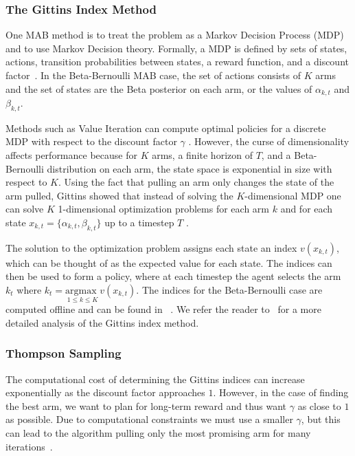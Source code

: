 \documentclass[10pt, conference]{ieeeconf}      %
\begin{document}

\subsubsection{The Gittins Index Method} 
One MAB method is to treat the problem as a Markov Decision Process (MDP) and to use Markov Decision theory.
Formally, a MDP is defined by sets of states, actions, transition probabilities between states, a reward function, and a discount factor~\cite{barto1998reinforcement}.
In the Beta-Bernoulli MAB case, the set of actions consists of $K$ arms and the set of states are the Beta posterior on each arm, or the values of $\alpha_{k,t}$ and $\beta_{k,t}$. 

Methods such as Value Iteration can compute optimal policies for a discrete MDP with respect to the discount factor $\gamma$ \cite{barto1998reinforcement}.
However, the curse of dimensionality affects performance because for $K$ arms, a finite horizon of $T$, and a
Beta-Bernoulli distribution on each arm, the state space is exponential in size with respect to $K$.
Using the fact that pulling an arm only changes the state of the arm pulled, Gittins showed that instead of solving the $K$-dimensional MDP one can solve $K$ 1-dimensional optimization problems for each arm $k$ and for each state $x_{k,t} = \lbrace \alpha_{k,t}, \beta_{k,t} \rbrace$ up to a timestep $T$ \cite{weber1992gittins}. 

The solution to the optimization problem assigns each state an index $v(x_{k,t})$, which can be thought of as the expected value for each state. 
The indices can then be used to form a policy, where at each timestep the agent selects the arm $k_t$ where $k_t= \underset{1 \leq k \leq K}{\mbox{argmax }} v(x_{k,t})$.  The indices for the Beta-Bernoulli case are computed offline and can be found in ~\cite{gittins2011multi}.
We refer the reader to~\cite{gittins2011multi} for a more detailed analysis of the Gittins index method.
 

\subsubsection{Thompson Sampling}
The computational cost of determining the Gittins indices can increase exponentially as the discount factor approaches $1$.
However, in the case of finding the best arm, we want to plan for long-term reward and thus want $\gamma$ as close to $1$ as possible.
Due to computational constraints we must use a smaller $\gamma$, but this can lead to the algorithm pulling only the most promising arm for many iterations~\cite{kelly1981multi}.
\end{document}
